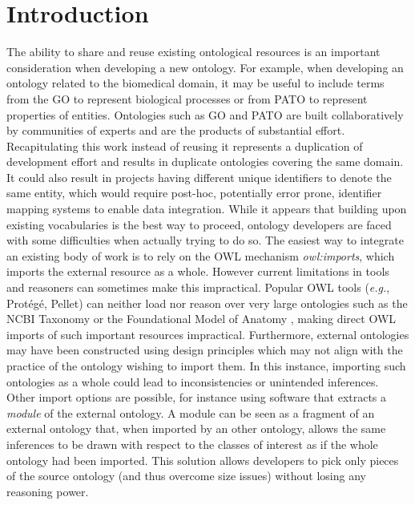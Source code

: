 \documentclass{ao2e}%
\begin{document}
\section{Introduction}

The ability to share and reuse existing ontological resources is an important consideration when developing a new ontology.
For example, when developing an ontology related to the biomedical domain, it may be useful to include terms from the \ac{GO}\cite{GO} to represent biological processes or from \ac{PATO}\cite{PATO} to represent properties of entities.
Ontologies such as GO and PATO are built collaboratively by communities of experts and are the products of substantial effort.
Recapitulating this work instead of reusing it represents a duplication of development effort and results in duplicate ontologies covering the same domain. It could also result in projects having different unique identifiers to denote the same entity, which would require post-hoc, potentially error prone, identifier mapping systems to enable data integration. 
While it appears that building upon existing vocabularies is the best way to proceed, ontology developers are faced with some difficulties when actually trying to do so.
The easiest way to integrate an existing body of work is to rely on the \ac{OWL} \cite{OWL} mechanism \emph{owl:imports}, which imports the external resource as a whole. However current limitations in tools and reasoners can sometimes make this impractical.
Popular OWL tools (\emph{e.g.}, Prot\'eg\'e\cite{Protege}, Pellet\cite{Sirin}) can neither load nor reason over very large ontologies such as the NCBI Taxonomy \cite{NCBI} or the Foundational Model of Anatomy \cite{FMA}, making direct \ac{OWL} imports of such important resources impractical. 
Furthermore, external ontologies may have been constructed using design principles which may not align with the practice of the ontology wishing to import them.  In this instance, importing such ontologies as a whole could lead to inconsistencies or unintended inferences. %
Other import options are possible, for instance using software that extracts a \emph{module} \cite{Grau} of the external ontology.
A module can be seen as a fragment of an external ontology that, when imported by an other ontology, allows the same inferences to be drawn with respect to the classes of interest as if the whole ontology had been imported. This solution allows developers to pick only pieces of the source ontology (and thus overcome size issues) without losing any reasoning power.
\end{document}
